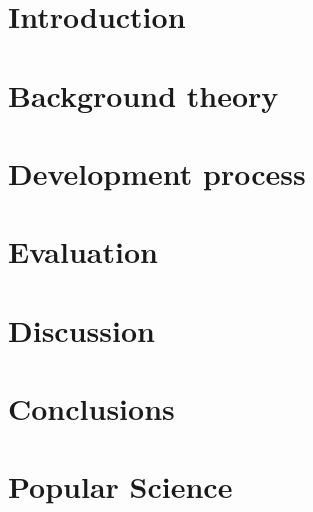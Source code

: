 \documentclass[nofilelist,dvipsnames]{cslthse-msc}
\begin{document}



\tableofcontents

\chapter{Introduction}

  

\chapter{Background theory}

  

\chapter{Development process}

  

\chapter{Evaluation}

  

\chapter{Discussion}

  

\chapter{Conclusions}

  

\chapter{Popular Science}

  

%
%
%  
\end{document}

